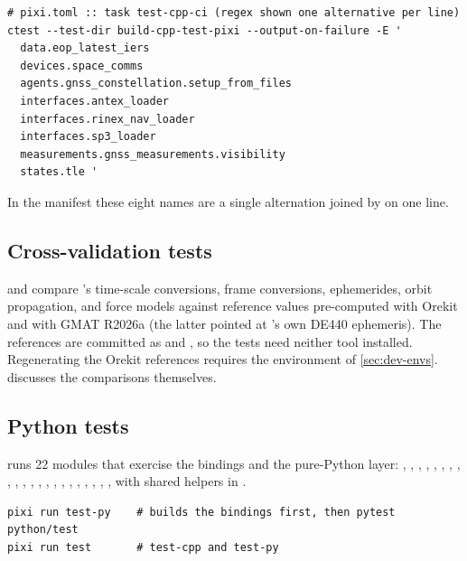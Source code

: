 \begin{lstlisting}[language=shell]
# pixi.toml :: task test-cpp-ci (regex shown one alternative per line)
ctest --test-dir build-cpp-test-pixi --output-on-failure -E '
  data.eop_latest_iers
  devices.space_comms
  agents.gnss_constellation.setup_from_files
  interfaces.antex_loader
  interfaces.rinex_nav_loader
  interfaces.sp3_loader
  measurements.gnss_measurements.visibility
  states.tle '
\end{lstlisting}

In the manifest these eight names are a single alternation joined by
\code{|} on one line.

\subsection{Cross-validation tests}

 and  compare \lupnt{}'s time-scale
conversions, frame conversions, ephemerides, orbit propagation, and force
models against reference values pre-computed with Orekit and with GMAT R2026a
(the latter pointed at \lupnt{}'s own DE440 ephemeris). The references
are committed as  and
, so the tests need neither tool
installed. Regenerating the Orekit references requires the 
environment of \cref{sec:dev-envs}.  discusses the
comparisons themselves.

\subsection{Python tests}

 runs 22 modules that exercise the bindings and the
pure-Python layer: , ,
, ,
, ,
, ,
, , ,
, ,
, ,
, ,
, ,
, ,
, with shared helpers in .

\begin{lstlisting}[language=shell]
pixi run test-py    # builds the bindings first, then pytest python/test
pixi run test       # test-cpp and test-py
\end{lstlisting}

